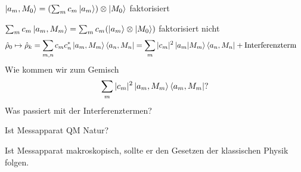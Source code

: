 	$\ket{a_m, M_0} = (\sum_m c_m \ket{a_m}) \otimes \ket{M_0}$ faktorisiert
	
	$\sum_m c_m \ket{a_m, M_m} = \sum_m c_m (\ket{a_m} \otimes \ket{M_0})$ faktorisiert nicht
	\begin{align*}
		\hat{\rho}_0 \mapsto \hat{\rho}_k &=
		\sum_{m,n} c_m c^*_n \ket{a_m, M_m} \bra{a_n, M_n} =
		\sum_m |c_m|^2 \ket{a_m| M_m }\bra{a_n, M_n} + \text{Interferenzterm}
	\end{align*}
	Wie kommen wir zum Gemisch
		\begin{align*}
			\sum_m |c_m|^2 \ket{a_m, M_m} \bra{a_m, M_m} ?
		\end{align*}
	Was passiert mit der Interferenztermen?
	
	Ist Messapparat QM Natur?
	
	Ist Messapparat makroskopisch, sollte er den Gesetzen der klassischen Physik folgen.